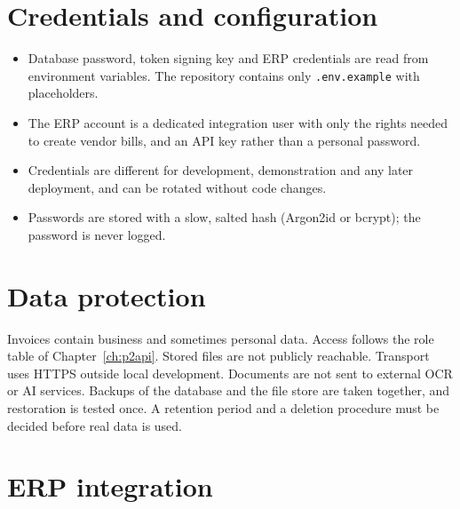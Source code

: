 \section{Credentials and configuration}
\begin{itemize}
\item Database password, token signing key and ERP credentials are read from environment variables. The repository contains only \texttt{.env.example} with placeholders.
\item The ERP account is a dedicated integration user with only the rights needed to create vendor bills, and an API key rather than a personal password.
\item Credentials are different for development, demonstration and any later deployment, and can be rotated without code changes.
\item Passwords are stored with a slow, salted hash (Argon2id or bcrypt); the password is never logged.
\end{itemize}

\section{Data protection}
Invoices contain business and sometimes personal data. Access follows the role table of Chapter~\ref{ch:p2api}. Stored files are not publicly reachable. Transport uses HTTPS outside local development. Documents are not sent to external OCR or AI services. Backups of the database and the file store are taken together, and restoration is tested once. A retention period and a deletion procedure must be decided before real data is used.

\section{ERP integration}
